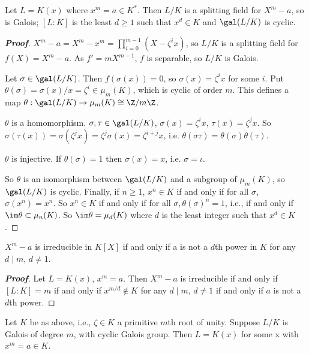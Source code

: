 \begin{theorem}
Let $L = K(x)$ where $x^m = a \in K^*$. Then $L/K$ is a splitting field for $X^m-a$, so is Galois; $[L : K]$ is the least $d \geq 1$ such that $x^d \in K$ and $\gal(L/K)$ is cyclic.
\end{theorem}

\begin{proof}[\bf Proof]
$X^m - a = X^m - x^m = \prod^{m-1}_{i=0} (X - \zeta^ix)$, so $L/K$ is a splitting field for $f(X) = X^m - a$. As $f' = m X^{m-1}$, $f$ is separable, so $L/K$ is Galois.

Let $\sigma \in \gal(L/K)$. Then $f(\sigma(x)) = 0$, so $\sigma(x) = \zeta^ix$ for some $i$. Put $\theta(\sigma) = \sigma(x)/x = \zeta^i \in \mu_m(K)$, which is cyclic of order $m$. This defines a map $\theta : \gal(L/K) \to \mu_m(K) \cong \Z/m\Z$.
\bit
\item $\theta$ is a homomorphism. $\sigma, \tau \in \gal(L/K)$, $\sigma(x) = \zeta^ix$, $\tau (x) = \zeta^jx$. So $\sigma(\tau (x)) = \sigma(\zeta^jx) = \zeta^j\sigma(x) = \zeta^{i+j}x$, i.e. $\theta(\sigma\tau ) = \theta(\sigma)\theta(\tau)$.
\item $\theta$ is injective. If $\theta(\sigma) = 1$ then $\sigma(x) = x$, i.e. $\sigma = \iota$.
\eit

So $\theta$ is an isomorphism between $\gal(L/K)$ and a subgroup of $\mu_m(K)$, so $\gal(L/K)$ is cyclic. Finally, if $n \geq  1$, $x^n \in K$ if and only if for all $\sigma$, $\sigma(x^n) = x^n$. So $x^n \in K$ if and only if for all $\sigma, \theta(\sigma)^n = 1$, i.e., if and only if $\im \theta \subset \mu_n(K)$. So $\im \theta = \mu_d(K)$ where $d$ is the least integer such that $x^d \in K$.
\end{proof}


\begin{corollary}
$X^m - a$ is irreducible in $K[X]$ if and only if a is not a $d$th power in $K$ for any $d \mid m$, $d \neq  1$.
\end{corollary}

\begin{proof}[\bf Proof]
Let $L = K(x)$, $x^m = a$. Then $X^m - a$ is irreducible if and only if $[L : K] = m$ if and only if $x^{m/d} \notin K$ for any $d \mid m$, $d \neq 1$ if and only if $a$ is not a $d$th power.
\end{proof}

\begin{theorem}
Let $K$ be as above, i.e., $\zeta \in K$ a primitive $m$th root of unity. Suppose $L/K$ is Galois of degree $m$, with cyclic Galois group. Then $L = K(x)$ for some x with $x^m = a \in K$.
\end{theorem}


